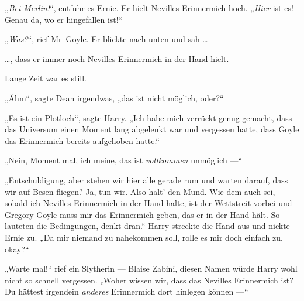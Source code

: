 „\emph{Bei Merlin!}“, entfuhr es Ernie. Er hielt Nevilles Erinnermich hoch.
„\emph{Hier} ist es! Genau da, wo er hingefallen ist!“

„\emph{Was?}“, rief Mr~Goyle. Er blickte nach unten und sah …

…, dass er immer noch Nevilles Erinnermich in der Hand hielt.

Lange Zeit war es still.

„Ähm“, sagte Dean irgendwas, „das ist nicht möglich, oder?“

„Es ist ein Plotloch“, sagte Harry.
„Ich habe mich verrückt genug gemacht, dass das Universum einen Moment lang abgelenkt war und vergessen hatte, dass Goyle das Erinnermich bereits aufgehoben hatte.“

„Nein, Moment mal, ich meine, das ist \emph{vollkommen} unmöglich —“

„Entschuldigung, aber stehen wir hier alle gerade rum und warten darauf, dass wir auf Besen fliegen? Ja, tun wir. Also halt’ den Mund. Wie dem auch sei, sobald ich Nevilles Erinnermich in der Hand halte, ist der Wettstreit vorbei und Gregory Goyle muss mir das Erinnermich geben, das er in der Hand hält. So lauteten die Bedingungen, denkt dran.“ Harry streckte die Hand aus und nickte Ernie zu.
„Da mir niemand zu nahekommen soll, rolle es mir doch einfach zu, okay?“

„Warte mal!“ rief ein Slytherin — Blaise Zabini, diesen Namen würde Harry wohl nicht so schnell vergessen.
„Woher wissen wir, dass das Nevilles Erinnermich ist? Du hättest irgendein \emph{anderes} Erinnermich dort hinlegen können —“

